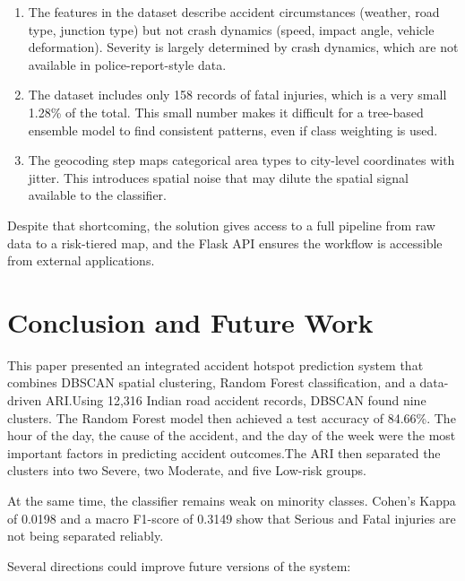 \documentclass[conference]{IEEEtran}
\begin{document}
\begin{enumerate}
\item The features in the dataset describe accident circumstances (weather, road type, junction type) but not crash dynamics (speed, impact angle, vehicle deformation). Severity is largely determined by crash dynamics, which are not available in police-report-style data.
\item The dataset includes only 158 records of fatal injuries, which is a very small 1.28\% of the total. This small number makes it difficult for a tree-based ensemble model to find consistent patterns, even if class weighting is used.
\item The geocoding step maps categorical area types to city-level coordinates with jitter. This introduces spatial noise that may dilute the spatial signal available to the classifier.
\end{enumerate}

Despite that shortcoming, the solution gives access to a full pipeline from raw data to a risk-tiered map, and the Flask API ensures the workflow is accessible from external applications.

\section{Conclusion and Future Work}

This paper presented an integrated accident hotspot prediction system that combines DBSCAN spatial clustering, Random Forest classification, and a data-driven ARI.Using 12,316 Indian road accident records, DBSCAN found nine clusters. The Random Forest model then achieved a test accuracy of 84.66\%. The hour of the day, the cause of the accident, and the day of the week were the most important factors in predicting accident outcomes.The ARI then separated the clusters into two Severe, two Moderate, and five Low-risk groups.

At the same time, the classifier remains weak on minority classes. Cohen's Kappa of 0.0198 and a macro F1-score of 0.3149 show that Serious and Fatal injuries are not being separated reliably.

Several directions could improve future versions of the system:
\end{document}
